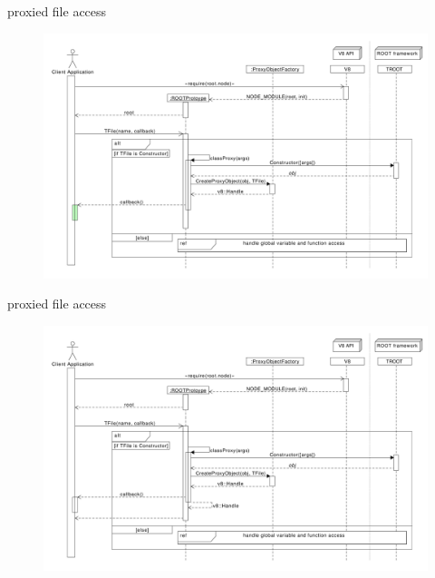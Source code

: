 \begin{frame}{proxied file access}
  \begin{figure}[htb]
    \centering
      \includegraphics[width=\textwidth, height=.85\textheight, keepaspectratio]{./resources/proxycall/fileOpen_h6.pdf}
  \end{figure}
\end{frame}

\begin{frame}{proxied file access}
  \begin{figure}[htb]
    \centering
      \includegraphics[width=\textwidth, height=.85\textheight, keepaspectratio]{./resources/proxycall/fileOpen_h0.pdf}
  \end{figure}
\end{frame}
